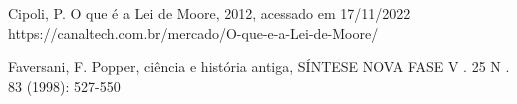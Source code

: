 \documentclass[
12pt,		%
openright,	%
twoside,  %
a4paper,			%
chapter=TITLE,		%
english,			%
french,				%
spanish,			%
brazil				%
]{USPSC-classe/USPSC}
\begin{document}
\begin{flushleft}
\begin{flushleft}
\begin{flushleft}
\begin{flushleft}
\begin{flushleft}
\begin{flushleft}
\begin{flushleft}
\begin{flushleft}
\begin{flushleft}
\begin{flushleft}
[CIPOLI, 2012] Cipoli, P. O que \'e a Lei de Moore, 2012, acessado em 17/11/2022 https://canaltech.com.br/mercado/O-que-e-a-Lei-de-Moore/
\end{flushleft}


\end{flushleft}


\end{flushleft}


\end{flushleft}


\end{flushleft}


\end{flushleft}


\end{flushleft}


\end{flushleft}


\end{flushleft}


\end{flushleft}


\begin{flushleft}
\begin{flushleft}
\begin{flushleft}
\begin{flushleft}
\begin{flushleft}
\begin{flushleft}
\begin{flushleft}
\begin{flushleft}
\begin{flushleft}
\begin{flushleft}
[FAVERSANI, 1998] Faversani, F. Popper, ci\^encia e hist\'oria antiga, S\'INTESE NOVA FASE V . 25 N . 83 (1998): 527-550
\end{flushleft}


\end{flushleft}


\end{flushleft}


\end{flushleft}


\end{flushleft}


\end{flushleft}


\end{flushleft}


\end{flushleft}


\end{flushleft}


\end{flushleft}
\end{document}
